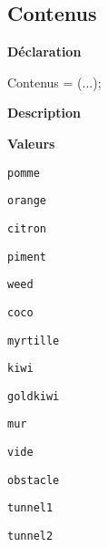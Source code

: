 \documentclass{report}
\newif\ifpdf
\begin{document}
\subsection*{Contenus}
\fi
\label{Types-Contenus}
\begin{list}{}{
\setlength{\itemindent}{0cm}
\setlength{\listparindent}{0cm}
\setlength{\leftmargin}{\evensidemargin}
\addtolength{\leftmargin}{\tmplength}
\settowidth{\labelsep}{X}
\addtolength{\leftmargin}{\labelsep}
\setlength{\labelwidth}{\tmplength}
}
\item[\textbf{Déclaration}\hfill]
\ifpdf
\begin{flushleft}
\fi
\begin{ttfamily}
Contenus = (...);\end{ttfamily}

\ifpdf
\end{flushleft}
\fi

\par
\item[\textbf{Description}]
 \item[\textbf{Valeurs}]
\begin{description}
\item[\texttt{pomme}] \label{Types-pomme}
\index{}
 
\item[\texttt{orange}] \label{Types-orange}
\index{}
 
\item[\texttt{citron}] \label{Types-citron}
\index{}
 
\item[\texttt{piment}] \label{Types-piment}
\index{}
 
\item[\texttt{weed}] \label{Types-weed}
\index{}
 
\item[\texttt{coco}] \label{Types-coco}
\index{}
 
\item[\texttt{myrtille}] \label{Types-myrtille}
\index{}
 
\item[\texttt{kiwi}] \label{Types-kiwi}
\index{}
 
\item[\texttt{goldkiwi}] \label{Types-goldkiwi}
\index{}
 
\item[\texttt{mur}] \label{Types-mur}
\index{}
 
\item[\texttt{vide}] \label{Types-vide}
\index{}
 
\item[\texttt{obstacle}] \label{Types-obstacle}
\index{}
 
\item[\texttt{tunnel1}] \label{Types-tunnel1}
\index{}
 
\item[\texttt{tunnel2}] \label{Types-tunnel2}
\index{}
 
\end{description}


\end{list}
\ifpdf
\end{document}
